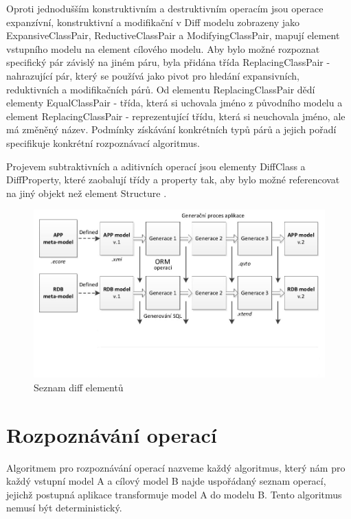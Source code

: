 \documentclass[11pt,twoside,a4paper]{book}
\begin{document}
 Oproti jednodušším konstruktivním a destruktivním operacím jsou operace
 expanzívní, konstruktivní a modifikační v Diff modelu zobrazeny jako
 ExpansiveClassPair, ReductiveClassPair a ModifyingClassPair, mapují element
 vstupního modelu na element cílového modelu. Aby bylo možné rozpoznat
 specifický pár závislý na jiném páru, byla přidána třída ReplacingClassPair -
 nahrazující pár, který se používá jako pivot pro hledání expansivních, 
 reduktivních a modifikačních párů. Od elementu ReplacingClassPair dědí elementy
 EqualClassPair - třída, která si uchovala jméno z původního modelu a element
 ReplacingClassPair - reprezentující třídu, která si neuchovala jméno, ale má
 změněný název. Podmínky získávání konkrétních typů párů a jejich pořadí
specifikuje konkrétní rozpoznávací algoritmus.
 
 Projevem subtraktivních a aditivních operací jsou elementy DiffClass a
 DiffProperty, které zaobalují třídy a property tak, aby bylo možné referencovat
 na jiný objekt než element Structure . 

\begin{figure}[ht]
\begin{center}
\includegraphics[width=15cm]{figures/framework_structura_tarant_modified}
\caption{Seznam diff elementů}
\label{fig:diff_meta}
\end{center}
\end{figure}

\section{Rozpoznávání operací}

Algoritmem pro rozpoznávání operací nazveme každý algoritmus, který nám pro
každý vstupní model A a cílový model B najde uspořádaný seznam operací, jejichž
postupná aplikace transformuje model A do modelu B. Tento algoritmus nemusí být
deterministický.
\end{document}
